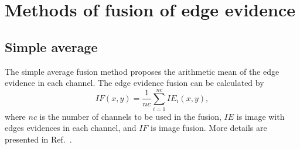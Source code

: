 \documentclass[conference]{IEEEtran}
\begin{document}
    

  

\section{Methods of fusion of edge evidence}\label{sec_07}

\subsection{Simple average}
The simple average fusion method proposes the arithmetic mean of the edge evidence in each channel. 
The edge evidence fusion can be calculated by
\begin{equation}
	IF(x,y)=\frac{1}{nc}\sum_{i=1}^{nc}IE_i(x,y),
\end{equation} 
where $nc$ is the number of channels to be used in the fusion, $IE$ is image with edges evidences in each channel, and $IF$ is image fusion.
More details are presented in Ref.~\cite{mit}.
\end{document}
